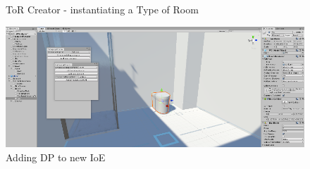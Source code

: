 \documentclass[runningheads]{llncs}
\begin{document}
\begin{figure}
     \centering
     \hspace{0.5cm}
     \caption{ToR Creator - instantiating a Type of Room}
     \label{steady_state}
\end{figure}

\begin{figure}[H]
\centering
\includegraphics[width=\textwidth, height=4.55cm]{editor4.png}
\caption{Adding DP to new IoE} \label{fig6}
\end{figure}
\end{document}
